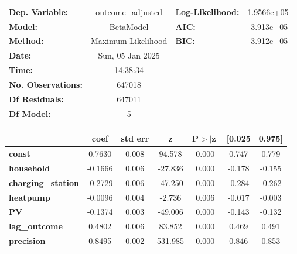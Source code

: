 \begin{center}
\begin{tabular}{lclc}
\toprule
\textbf{Dep. Variable:}    & outcome\_adjusted  & \textbf{  Log-Likelihood:    } & 1.9566e+05  \\
\textbf{Model:}            &     BetaModel      & \textbf{  AIC:               } & -3.913e+05  \\
\textbf{Method:}           & Maximum Likelihood & \textbf{  BIC:               } & -3.912e+05  \\
\textbf{Date:}             &  Sun, 05 Jan 2025  & \textbf{                     } &             \\
\textbf{Time:}             &      14:38:34      & \textbf{                     } &             \\
\textbf{No. Observations:} &       647018       & \textbf{                     } &             \\
\textbf{Df Residuals:}     &       647011       & \textbf{                     } &             \\
\textbf{Df Model:}         &            5       & \textbf{                     } &             \\
\bottomrule
\end{tabular}
\begin{tabular}{lcccccc}
                           & \textbf{coef} & \textbf{std err} & \textbf{z} & \textbf{P$> |$z$|$} & \textbf{[0.025} & \textbf{0.975]}  \\
\midrule
\textbf{const}             &       0.7630  &        0.008     &    94.578  &         0.000        &        0.747    &        0.779     \\
\textbf{household}         &      -0.1666  &        0.006     &   -27.836  &         0.000        &       -0.178    &       -0.155     \\
\textbf{charging\_station} &      -0.2729  &        0.006     &   -47.250  &         0.000        &       -0.284    &       -0.262     \\
\textbf{heatpump}          &      -0.0096  &        0.004     &    -2.736  &         0.006        &       -0.017    &       -0.003     \\
\textbf{PV}                &      -0.1374  &        0.003     &   -49.006  &         0.000        &       -0.143    &       -0.132     \\
\textbf{lag\_outcome}      &       0.4802  &        0.006     &    83.852  &         0.000        &        0.469    &        0.491     \\
\textbf{precision}         &       0.8495  &        0.002     &   531.985  &         0.000        &        0.846    &        0.853     \\
\bottomrule
\end{tabular}
\end{center}